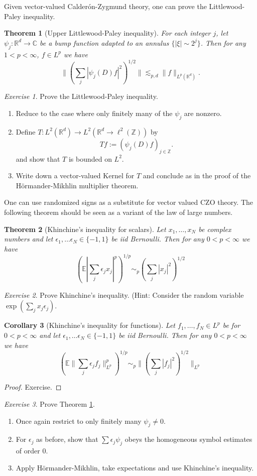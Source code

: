 \documentclass[11pt]{article}
\newtheorem{thm}{Theorem}
\newtheorem{cor}[thm]{Corollary}
\theoremstyle{remark}
\newtheorem{exr}{Exercise}
\newcommand{\1}{\textbf{1}}
\newcommand{\lle}{\lesssim}
\def\norm#1{\| #1  \|}
\newcommand{\bbR}{\mathbb{R}}
\newcommand{\bbZ}{\mathbb{Z}}
\newcommand{\bbC}{\mathbb{C}}
\newcommand{\bbE}{\mathbb{E}}
\begin{document}
Given vector-valued Calder\'on-Zygmund theory, one can prove the Littlewood-Paley inequality.
\begin{thm}[Upper Littlewood-Paley inequality]
 For each integer $j$, let $\psi_j: \bbR^d \to \bbC$ be a bump function adapted to an annulus $\{|\xi| \sim 2^j\}$. Then for any $1 < p < \infty$, $f \in L^p$ we have
 \[
 \norm{(\sum_{j} |\psi_j(D) f|^2 )^{1/2} } \lle_{p,d} \norm{f}_{L^p(\bbR^d)}.
 \]
 \label{thm:lilpal}
\end{thm}
 \begin{exr}
Prove the Littlewood-Paley inequality.
\begin{enumerate}
\item[(1)] Reduce to the case where only finitely many of the $\psi_j$ are nonzero.
\item[(2)] Define $T: L^2(\bbR^d) \to L^2(\bbR^d \to \ell^2(\bbZ))$ by
\[
Tf := (\psi_j(D)f)_{j \in \bbZ}.
\]
and show that $T$ is bounded on $L^2$.
\item[(3)] Write down a vector-valued Kernel for $T$ and conclude as in the proof of the H\"ormander-Mikhlin multiplier theorem.
\end{enumerate}
\end{exr}
One can use randomized signs as a substitute for vector valued CZO theory. The following theorem should be seen as a variant of the law of large numbers.
\begin{thm}[Khinchine's inequality for scalars]
Let $x_1, \ldots, x_N$ be complex numbers and let $\epsilon_1, \ldots \epsilon_N \in \{-1,1\}$ be iid Bernoulli. Then for any $0 < p < \infty$ we have
\[
(\bbE|\sum_j \epsilon_j x_j|^p)^{1/p} \sim_p (\sum_j |x_j|^2)^{1/2}
\]
\end{thm}
\begin{exr}
Prove Khinchine's inequality. (Hint: Consider the random variable $\exp \left( \sum_j x_j \epsilon_j \right)$.
\end{exr}
\begin{cor}[Khinchine's inequality for functions]
Let $f_1, \ldots, f_N \in L^p$ be for $0 < p < \infty$ and let $\epsilon_1, \ldots \epsilon_N \in \{-1,1\}$ be iid Bernoulli. Then for any $0 < p < \infty$ we have
\[
(\bbE \norm{\sum_j \epsilon_j f_j}_{L^p}^p)^{1/p} \sim_p \norm{(\sum_j |f_j|^2)^{1/2}}_{L^p}
\]
\end{cor}
\begin{proof}
Exercise.
\end{proof}
\begin{exr}
Prove Theorem \ref{thm:lilpal}.
\begin{enumerate}
\item[(1)] Once again restrict to only finitely many $\psi_j \neq 0$.
\item[(2)] For $\epsilon_j$ as before, show that $\sum \epsilon_j \psi_j $ obeys the homogeneous symbol estimates of order $0$.
\item[(3)] Apply H\"ormander-Mikhlin, take expectations and use Khinchine's inequality.
\end{enumerate}
\end{exr}
\newpage
\end{document}
